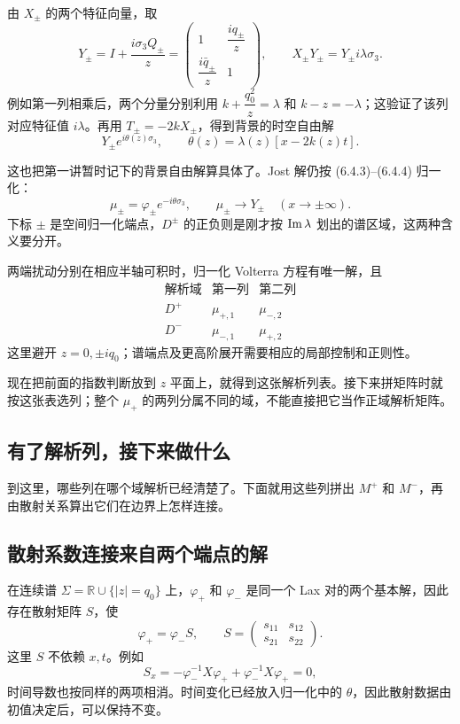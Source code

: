 \documentclass[lang=cn,scheme=chinese,mode=simple,device=normal,color=blue,math=cm,thmcnt=section,12pt]{elegantbook}
\begin{document}
由 $X_\pm$ 的两个特征向量，取
\[
Y_\pm=I+\dfrac{i\sigma_3Q_\pm}{z}
=\begin{pmatrix}1&\dfrac{iq_\pm}{z}\\[2pt]\dfrac{i\bar q_\pm}{z}&1\end{pmatrix},
\qquad X_\pm Y_\pm=Y_\pm i\lambda\sigma_3.
\]
例如第一列相乘后，两个分量分别利用 $k+\dfrac{q_0^2}{z}=\lambda$ 和 $k-z=-\lambda$；这验证了该列对应特征值 $i\lambda$。再用 $T_\pm=-2kX_\pm$，得到背景的时空自由解
\[
Y_\pm e^{i\theta(z)\sigma_3},\qquad
\theta(z)=\lambda(z)[x-2k(z)t].
\]

这也把第一讲暂时记下的背景自由解算具体了。Jost 解仍按 (6.4.3)--(6.4.4) 归一化：
\[
\mu_\pm=\varphi_\pm e^{-i\theta\sigma_3},\qquad
\mu_\pm\longrightarrow Y_\pm\quad(x\to\pm\infty).
\]
下标 $\pm$ 是空间归一化端点，$D^\pm$ 的正负则是刚才按 $\operatorname{Im}\lambda$ 划出的谱区域，这两种含义要分开。

\setcounter{theorem}{0}
\begin{theorem}
两端扰动分别在相应半轴可积时，归一化 Volterra 方程有唯一解，且
\[
\begin{array}{c|cc}
\text{解析域} & \text{第一列} & \text{第二列}\\ \hline
D^+ & \mu_{+,1} & \mu_{-,2}\\
D^- & \mu_{-,1} & \mu_{+,2}
\end{array}
\]
这里避开 $z=0,\pm iq_0$；谱端点及更高阶展开需要相应的局部控制和正则性。
\end{theorem}
现在把前面的指数判断放到 $z$ 平面上，就得到这张解析列表。接下来拼矩阵时就按这张表选列；整个 $\mu_+$ 的两列分属不同的域，不能直接把它当作正域解析矩阵。

\subsection*{有了解析列，接下来做什么}
到这里，哪些列在哪个域解析已经清楚了。下面就用这些列拼出 $M^+$ 和 $M^-$，再由散射关系算出它们在边界上怎样连接。

\subsection*{散射系数连接来自两个端点的解}
在连续谱 $\Sigma=\mathbb R\cup\{|z|=q_0\}$ 上，$\varphi_+$ 和 $\varphi_-$ 是同一个 Lax 对的两个基本解，因此存在散射矩阵 $S$，使
\[
\varphi_+=\varphi_-S,\qquad S=\begin{pmatrix}s_{11}&s_{12}\\s_{21}&s_{22}\end{pmatrix}.
\]
这里 $S$ 不依赖 $x,t$。例如
\[
S_x=-\varphi_-^{-1}X\varphi_++\varphi_-^{-1}X\varphi_+=0,
\]
时间导数也按同样的两项相消。时间变化已经放入归一化中的 $\theta$，因此散射数据由初值决定后，可以保持不变。
\end{document}
